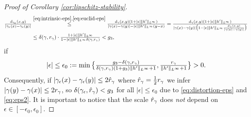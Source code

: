 \begin{proof}[Proof of Corollary {\ref{cor:lipschitz-stability}}]
\begin{align}
\begin{split}\label{eq:distortion-eps}
\textstyle\frac{d_{\gamma_\epsilon}(x,y)}{|\gamma_\epsilon(x)-\gamma_\epsilon(y)|}
&  \overset{\eqref{eq:intrinsic-eps},\eqref{eq:euclid-eps}}{\le}
\textstyle
\frac{d_{\gamma}(x,y)(1+|\epsilon|\|h'\|_{L^\infty})}{|\gamma(x)-\gamma(y)|-
|\epsilon|\|h'\|_{L^\infty}(y-x)}=
 \frac{d_{\gamma}(x,y)(1+|\epsilon|\|h'\|_{L^\infty})}{|\gamma(x)-\gamma(y)|
 \big(1-|\epsilon|\|h'\|_{L^\infty}\frac{d_\gamma(x,y)}{|\gamma(x)-\gamma(y)|}\big)} \\
 & \le \textstyle
 \delta(\gamma,r_\gamma)\cdot\frac{1+|\epsilon|\|h'\|_{L^\infty}}{
 1-|\epsilon|\|h'\|_{L^\infty}\delta(\gamma,r_\gamma)}<g_3,
\end{split}
\end{align}
if
\begin{equation}\label{eq:eps2}
\textstyle
|\epsilon|\le\epsilon_0:=\min\big\{\frac{g_3-\delta(\gamma,r_\gamma)}{\delta(\gamma,r_\gamma)(1+g_3)\|h'\|_{L^\infty}+1},\frac{r_\gamma}{\|h'\|_{L^\infty}+1}\big\}>0.
\end{equation}
Consequently, if $|\gamma_\epsilon(x)-\gamma_\epsilon(y)|\le2\hat r_\gamma$ where $\hat r_\gamma=\tfrac12 r_\gamma$
we infer
$|\gamma(y)-\gamma(x)|\le 2r_\gamma$, so $\delta(\gamma_\epsilon,\hat{r}_\gamma)<g_3$
for all $|\epsilon|\le\epsilon_0$
due to \eqref{eq:distortion-eps} and
\eqref{eq:eps2}.
It is important to notice that the scale
$\hat{r}_\gamma$ does \emph{not} depend on $\epsilon\in [-\epsilon_0,\epsilon_0]$.

\end{proof}
